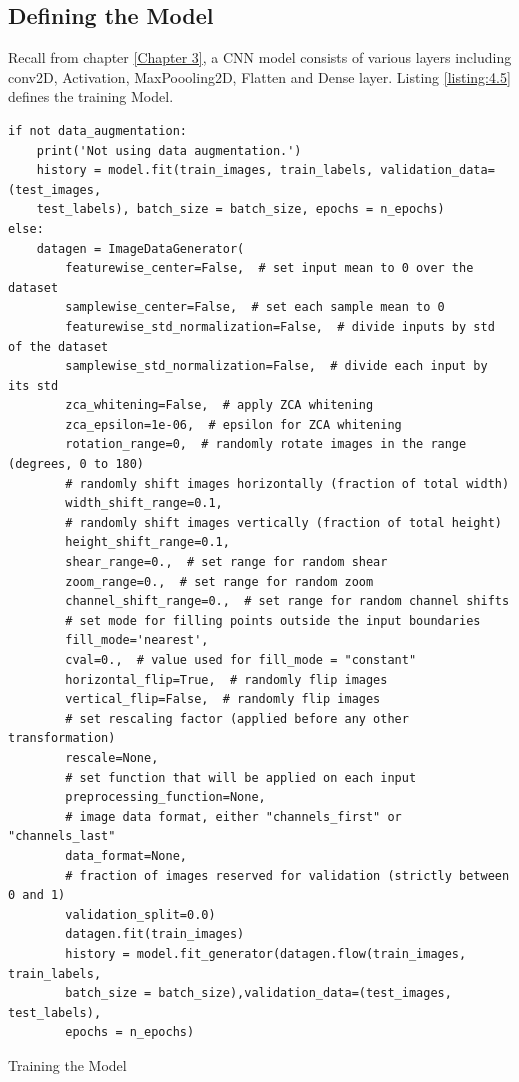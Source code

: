 \subsection{Defining the Model}
Recall from chapter \ref{Chapter 3}, a CNN model consists of various layers including
conv2D, Activation, MaxPoooling2D, Flatten and Dense layer. Listing \ref{listing:4.5}
defines the training Model.

\begin{listing}[H]
    \begin{verbatim}
if not data_augmentation:
    print('Not using data augmentation.')
    history = model.fit(train_images, train_labels, validation_data=(test_images,
    test_labels), batch_size = batch_size, epochs = n_epochs)
else:
    datagen = ImageDataGenerator(
        featurewise_center=False,  # set input mean to 0 over the dataset
        samplewise_center=False,  # set each sample mean to 0
        featurewise_std_normalization=False,  # divide inputs by std of the dataset
        samplewise_std_normalization=False,  # divide each input by its std
        zca_whitening=False,  # apply ZCA whitening
        zca_epsilon=1e-06,  # epsilon for ZCA whitening
        rotation_range=0,  # randomly rotate images in the range (degrees, 0 to 180)
        # randomly shift images horizontally (fraction of total width)
        width_shift_range=0.1,
        # randomly shift images vertically (fraction of total height)
        height_shift_range=0.1,
        shear_range=0.,  # set range for random shear
        zoom_range=0.,  # set range for random zoom
        channel_shift_range=0.,  # set range for random channel shifts
        # set mode for filling points outside the input boundaries
        fill_mode='nearest',
        cval=0.,  # value used for fill_mode = "constant"
        horizontal_flip=True,  # randomly flip images
        vertical_flip=False,  # randomly flip images
        # set rescaling factor (applied before any other transformation)
        rescale=None,
        # set function that will be applied on each input
        preprocessing_function=None,
        # image data format, either "channels_first" or "channels_last"
        data_format=None,
        # fraction of images reserved for validation (strictly between 0 and 1)
        validation_split=0.0)
        datagen.fit(train_images)
        history = model.fit_generator(datagen.flow(train_images, train_labels,
        batch_size = batch_size),validation_data=(test_images, test_labels),
        epochs = n_epochs)  
    \end{verbatim}
    \caption{Training the Model}
\label{listing:4.6}
\end{listing}